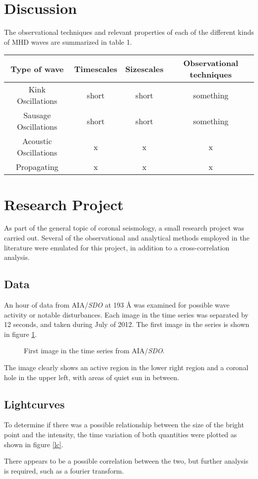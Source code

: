 \documentclass[preprint2]{aastex}
\begin{document}
\section{Discussion}\label{disc}
The observational techniques and relevant properties of each of the different
kinds of MHD waves are summarized in table 1.
\begin{table*}[ht]
    \centering
    \begin{tabular}{c c c c}
        \hline\hline
        Type of wave &
        Timescales &
        Sizescales &
        Observational techniques\\
        \hline
        Kink Oscillations & short & short & something\\
        Sausage Oscillations & short & short & something\\
        Acoustic Oscillations & x & x & x\\
        Propagating & x & x & x\\
        \hline\hline
    \end{tabular}
\end{table*}

\section{Research Project}\label{project}
As part of the general topic of coronal seismology,
a small research project was carried out.
Several of the observational
and analytical methods employed in the literature were emulated for
this project, in addition to a cross-correlation analysis.
\subsection{Data}
An hour of data from AIA/\emph{SDO} at 193 \AA{} was examined for possible
wave activity or notable disturbances. Each image in the time series was
separated by 12 seconds, and taken during July of 2012. The first image in
the series is shown in figure {\ref{full}}.
\begin{figure}[!htb]
    \caption{First image in the time series from AIA/\emph{SDO}.}
    \label{full}
\end{figure}
The image clearly shows an active region in the lower right region
and a coronal hole in the upper left, with areas of quiet sun in between.


\subsection{Lightcurves}
To determine if there was a possible relationship between the size of the
bright point and the intensity, the time variation of both quantities were
plotted as shown in figure {\ref{lc}}.
\begin{figure*}[!htb]
    \caption{Size and intensity (counts per pixel) of the bright point as
        functions of time throughout the entire data series.}
    \label{lc}
\end{figure*}
There appears to be a possible correlation between the two, but further
analysis is required, such as a fourier transform.
\end{document}
